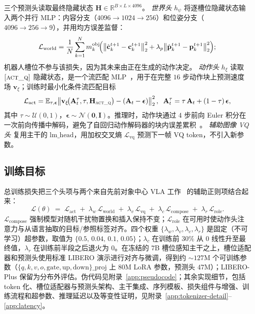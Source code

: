 \documentclass{article}
\begin{document}
三个预测头读取最终隐藏状态 $\mathbf{H}\!\in\!\mathbb{R}^{B\times L\times 4096}$。 \emph{世界头} $h_\psi$ 将逐槽位隐藏状态输入两个并行 MLP：内容分支（$4096{\to}1024{\to}256$）和位姿分支（$4096{\to}256{\to}9$），并用均方误差监督：
\begin{equation}
\mathcal{L}_\mathrm{world}=\frac{1}{N}\sum_{k=1}^{N}m_k^\mathrm{obj}\!\Bigl(\bigl\|\hat{\mathbf{c}}_k^{t+1}-\mathbf{c}_k^{t+1}\bigr\|_2^2+\lambda_p\bigl\|\hat{\mathbf{p}}_k^{t+1}-\mathbf{p}_k^{t+1}\bigr\|_2^2\Bigr);
\label{eq:world}
\end{equation}
机器人槽位不参与该损失，因为其未来由正在生成的动作决定。 \emph{动作头} $h_\xi$ 读取 $\textsc{[act\_q]}$ 隐藏状态，是一个流匹配 MLP~\citep{flowmatching,pi0}，用于在完整 $16$ 步动作块上预测速度场 $\mathbf{v}_\xi$；训练时最小化条件流匹配目标
\begin{equation}
\mathcal{L}_\mathrm{act}=\mathbb{E}_{\tau,\boldsymbol{\epsilon}}\!\left\|\mathbf{v}_\xi\!\bigl(\mathbf{A}_t^\tau,\tau,\mathbf{H}_{\textsc{act\_q}}\bigr)-(\mathbf{A}_t-\boldsymbol{\epsilon})\right\|_2^2,\;\;\mathbf{A}_t^\tau=\tau\,\mathbf{A}_t+(1-\tau)\,\boldsymbol{\epsilon},
\label{eq:act}
\end{equation}
其中 $\tau\sim\mathcal{U}(0,1)$，$\boldsymbol{\epsilon}\sim\mathcal{N}(\mathbf{0},\mathbf{I})$。推理时，动作块通过 $4$ 步前向 Euler 积分在一次前向传播中解码，避免了自回归动作解码器的块内误差累积~\citep{rynnvla002,worldvla}。 \emph{辅助图像 VQ 头} 复用主干的 $\mathrm{lm\_head}$，用加权交叉熵 $\mathcal{L}_\mathrm{vq}$ 预测下一帧 VQ token，不引入新参数。

\subsection{训练目标}

总训练损失把三个头项与两个来自先前对象中心 VLA 工作~\citep{slotvla,oatvla} 的辅助正则项结合起来：
\begin{equation}
\mathcal{L}(\theta) \;=\; \mathcal{L}_\mathrm{act} \;+\; \lambda_w\,\mathcal{L}_\mathrm{world} \;+\; \lambda_v\,\mathcal{L}_\mathrm{vq} \;+\; \lambda_c\,\mathcal{L}_\mathrm{compose} \;+\; \lambda_r\,\mathcal{L}_\mathrm{role}.
\label{eq:loss}
\end{equation}
$\mathcal{L}_\mathrm{compose}$ 强制模型对随机干扰物置换和插入保持不变；$\mathcal{L}_\mathrm{role}$ 在可用时使动作头注意力与从语言抽取的目标/参照标签对齐。四个权重 $\{\lambda_w,\lambda_v,\lambda_c,\lambda_r\}$ 是固定（不可学习）超参数，取值为 $\{0.5,\,0.04,\,0.1,\,0.05\}$；$\lambda_c$ 在训练前 $30\%$ 从 $0$ 线性升至最终值，$\lambda_r$ 在训练前半段之后退火为 $0$。在冻结的 $7$B 槽位感知主干之上，槽位适配器和预测头使用标准 LIBERO 演示进行对齐与微调，得到约 $\sim\!127$M 个可训练参数（$\{q,k,v,o,\mathrm{gate},\mathrm{up},\mathrm{down}\}\text{\_proj}$ 上 $80$M LoRA 参数，预测头 $47$M）；LIBERO-Plus 保留为分布外评估。伪代码见附录~\ref{app:pseudocode}；其余实现细节，包括 token 化、槽位适配器与预测头架构、主干集成、序列模板、损失组件与增强、训练流程和超参数、推理延迟以及等变性证明，见附录~\ref{app:tokenizer-detail}--\ref{app:latency}。
\end{document}
